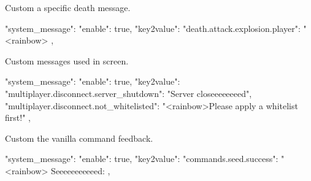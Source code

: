 \begin{example}{Custom a specific death message.}
    \begin{json}
        "system_message": {
            "enable": true,
            "key2value": {
                "death.attack.explosion.player": "<rainbow>%
            }
        },
    \end{json}
\end{example}

\begin{example}{Custom messages used in screen.}
    \begin{json}
        "system_message": {
            "enable": true,
            "key2value": {
                "multiplayer.disconnect.server_shutdown": "Server closeeeeeeeed",
                "multiplayer.disconnect.not_whitelisted": "<rainbow>Please apply a whitelist first!"
            }
        },
    \end{json}
\end{example}

\begin{example}{Custom the vanilla command feedback.}
    \begin{json}
        "system_message": {
            "enable": true,
            "key2value": {
                "commands.seed.success": "<rainbow> Seeeeeeeeeeed: %
            }
        },
    \end{json}
\end{example}